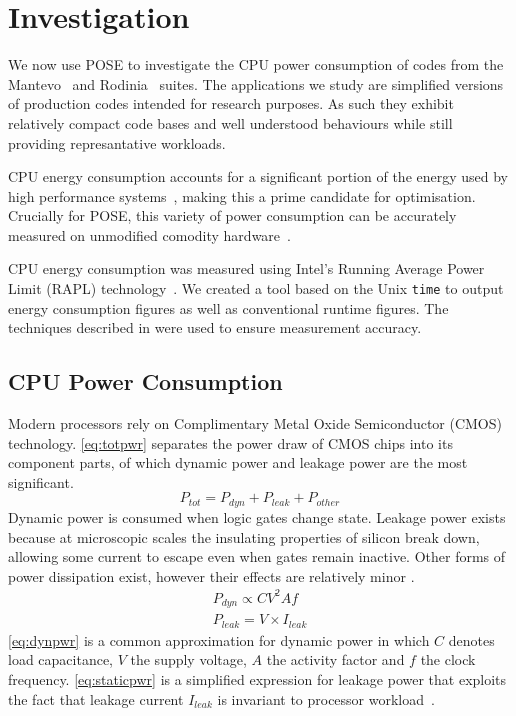 \section{Investigation}
\label{sec:investigation}
We now use POSE to investigate the CPU power consumption of codes from the Mantevo~\cite{heroux:2009aa} and Rodinia~\cite{che:2009aa} suites.
The applications we study are simplified versions of production codes intended for research purposes.
As such they exhibit relatively compact code bases and well understood behaviours while still providing represantative workloads.

CPU energy consumption accounts for a significant portion of the energy used by high performance systems~\cite{rong:2010aa}, making this a prime candidate for optimisation.
Crucially for POSE, this variety of power consumption can be accurately measured on unmodified comodity hardware~\cite{hackenberg:2013aa}.

CPU energy consumption was measured using Intel's Running Average Power Limit (RAPL) technology~\cite{david:2010aa}.
We created a tool based on the Unix \texttt{time} to output energy consumption figures as well as conventional runtime figures.
The techniques described in \cite{hahnel:2012aa} were used to ensure measurement accuracy.


\subsection{CPU Power Consumption}
\label{ssec:cpupower}
Modern processors rely on Complimentary Metal Oxide Semiconductor (CMOS) technology.
\autoref{eq:totpwr} separates the power draw of CMOS chips into its component parts, of which dynamic power and leakage power are the most significant.
\begin{equation}
\label{eq:totpwr}
P_{tot} = P_{dyn} + P_{leak} + P_{other}
\end{equation}
Dynamic power is consumed when logic gates change state.
Leakage power exists because at microscopic scales the insulating properties of silicon break down, allowing some current to escape even when gates remain inactive.
Other forms of power dissipation exist, however their effects are relatively minor \cite{kaxiras:2008aa}.
\begin{gather}
P_{dyn} \propto CV^{2}Af \label{eq:dynpwr} \\
P_{leak} = V \times I_{leak} \label{eq:staticpwr}
\end{gather}
\autoref{eq:dynpwr} is a common approximation for dynamic power in which $C$ denotes load capacitance, $V$ the supply voltage, $A$ the activity factor and $f$ the clock frequency.
\autoref{eq:staticpwr} is a simplified expression for leakage power that exploits the fact that leakage current $I_{leak}$ is invariant to processor workload~\cite{kim:2003aa}.

